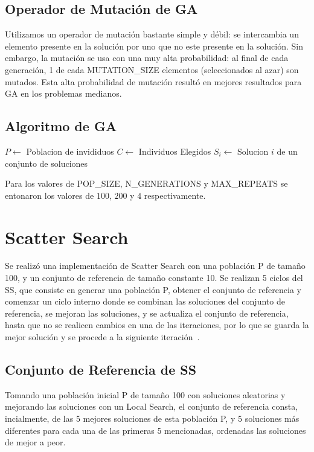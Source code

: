 \documentclass{ci5652}
\begin{document}
\subsection{Operador de Mutación de GA}
Utilizamos un operador de mutación bastante simple y débil: se intercambia un elemento presente en la solución por uno que no este presente en la solución. Sin embargo, la mutación se usa con una muy alta probabilidad: al final de cada generación, 1 de cada MUTATION\_SIZE elementos (seleccionados al azar) son mutados. Esta alta probabilidad de mutación resultó en mejores resultados para GA en los problemas medianos.

\subsection{Algoritmo de GA}
\begin{algorithm}[h!]
\DontPrintSemicolon
$P \leftarrow$ Poblacion de invididuos\;
$C \leftarrow$ Individuos Elegidos\;
$S_i \leftarrow$ Solucion $i$ de un conjunto de soluciones\;
\end{algorithm}

Para los valores de POP\_SIZE, N\_GENERATIONS y MAX\_REPEATS se entonaron los valores de $100$, $200$ y $4$ respectivamente.

\section{Scatter Search}
Se realizó una implementación de Scatter Search con una población P de tamaño 100, y un conjunto de referencia de tamaño constante 10. Se realizan 5 ciclos del SS, que consiste en generar una población P, obtener el conjunto de referencia y comenzar un ciclo interno donde se combinan las soluciones del conjunto de referencia, se mejoran las soluciones, y se actualiza el conjunto de referencia, hasta que no se realicen cambios en una de las iteraciones, por lo que se guarda la mejor solución y se procede a la siguiente iteración~\cite{ssmarti}.

\subsection{Conjunto de Referencia de SS}
Tomando una población inicial P de tamaño 100 con soluciones aleatorias y mejorando las soluciones con un Local Search, el conjunto de referencia consta, incialmente, de las 5 mejores soluciones de esta población P, y 5 soluciones más diferentes para cada una de las primeras 5 mencionadas, ordenadas las soluciones de mejor a peor.
\end{document}
